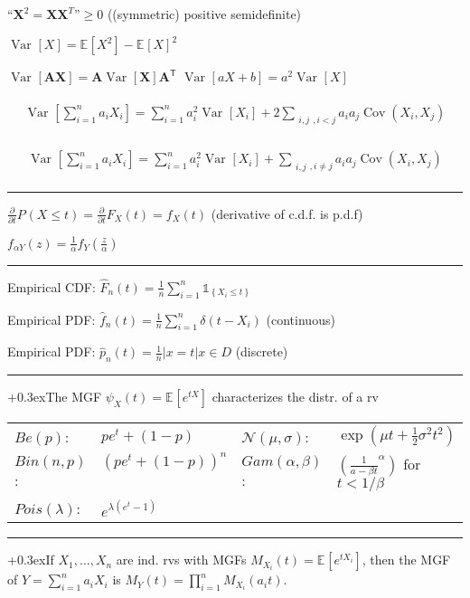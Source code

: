 \documentclass[a4paper,10pt,twoside]{extarticle}
\newcommand{\cN}{\mathcal{N}}
\newcommand{\set}[1]{\left\{ #1 \right\}}
\newcommand{\card}[1]{\left\lvert #1 \right\rvert}
\newcommand{\Prob}[2][]{P_{#1}\left( #2 \right)}
\newcommand{\Var}[2][]{\operatorname{Var}_{#1}\left[ #2 \right]}
\newcommand{\Exp}[2][]{{\mathbb{E}_{#1}}\left[ #2
\right]}
\newcommand{\Cov}[1]{\operatorname{Cov}\left(#1 \right)}
\newcommand{\ind}[1]{\mathds{1}_{\set{#1}}}
\newcommand{\rX}{X}
\newcommand{\rY}{Y}
\newcommand*{\T}{\mathsf{T}}
\newcommand{\mat}[1]{\mathbf{#1}}
\newcommand{\MA}{\mat{A}}
\newcommand{\MX}{\mat{X}}
\newcommand{\emptyarg}[1][]{\ifthenelse{\isempty{#1}}{}{\ (#1)}}
\newcommand{\Thm}[1][]{%
\color{custtitlecolor}{\textbf{T.\emptyarg[#1]}}
\kern+0.3ex}
\newcommand{\sep}{\vspace{0pt}\noindent\hrule\vspace{0pt}}
\begin{document}
\begin{landscape}
\begin{multicols*}{3}
``$\MX^2=\MX\MX^T$''$\geq 0$ ((symmetric) positive semidefinite)

$
\Var{X}=\Exp{X^2}-\Exp{X}^2
$

$
\Var{\MA\MX}=\MA\Var{\MX}\MA^\T
$
\quad
$\Var{aX+b}=a^2\Var{X}$

\begin{gather*}
\begin{align*}
\textstyle{
\Var{\sum_{i=1}^n a_iX_i}
=
\sum_{i=1}^n a_i^2\Var{X_i}
+
2\sum_{\substack{i,j},i<j}a_ia_j\Cov{X_i,X_j}
}
\end{align*}
\end{gather*}

\begin{gather*}
\begin{align*}
\textstyle{
\Var{\sum_{i=1}^n a_iX_i}
=
\sum_{i=1}^n a_i^2\Var{X_i}
+
\sum_{\substack{i,j},i\neq j}a_ia_j\Cov{X_i,X_j}
}
\end{align*}
\end{gather*}

\sep

$
\frac{\partial}{\partial t} \Prob{X\leq t}
=
\frac{\partial}{\partial t} F_X(t)
=
f_X(t)
$
(derivative of c.d.f. is p.d.f)

$
f_{\alpha Y}(z)
=
\frac{1}{\alpha}f_Y(\frac{z}{\alpha})
$

\sep

Empirical CDF: $\hat{F}_n(t)=\frac{1}{n}\sum_{i=1}^n \ind{X_i\leq t}$

Empirical PDF: $\hat{f}_n(t)=\frac{1}{n}\sum_{i=1}^n\delta(t-X_i)$ (continuous)

Empirical PDF: $\hat{p}_n(t)=\frac{1}{n}\card{x=t}{x\in D}$ (discrete)

\sep

\Thm The MGF $\psi_{X}(t)=\Exp{e^{tX}}$ characterizes the distr. of a
rv

\begin{tabular}{@{}l@{}l|l@{}l@{}}
$Be(p)$: & $pe^t+(1-p)$
&
$\cN(\mu,\sigma)$: & $\exp\left(\mu t + \frac{1}{2}\sigma^2 t^2\right)$
\\
$Bin(n,p)$:\, & $(pe^t + (1-p))^n$\,
&
$Gam(\alpha,\beta)$:\, & $\left(\frac{1}{a-\beta t}^\alpha\right)$ for
$t<1/\beta$
\\
$Pois(\lambda)$: & $e^{\lambda(e^t -1)}$
\\
\end{tabular}

\sep

\Thm If $\rX_1,\ldots,\rX_n$ are ind. rvs with 
MGFs $M_{\rX_i}(t)=\Exp{e^{t\rX_i}}$, then the
MGF of $\rY=\sum_{i=1}^n a_i\rX_i$
is $M_{\rY}(t)=\prod_{i=1}^n M_{X_i}(a_it)$.


\end{multicols*}
\end{landscape}
\end{document}
